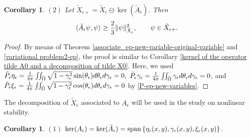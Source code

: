 \documentclass[1 [leqno, 11pt]{amsart}
\numberwithin{equation}{section}
\let\ep=\epsilon
\newtheorem{Corollary}[Theorem]{Corollary}
\begin{document}
\begin{CJK*}{GBK}{song}
\begin{Corollary}
$(2)$ Let $\tilde X_{\ep+}=\tilde X_\ep \ominus\ker (\tilde A_\ep)$. Then
\begin{align*}
\langle \tilde A_\ep \psi,\psi\rangle \geq {2\over3} \| \psi\|_{\tilde X_\ep}^2, \quad \quad \psi\in \tilde X_{\ep+}.
\end{align*}
\end{Corollary}

\begin{proof}
By means of  Theorem \ref{associate_ep-new-variable-original-variable} and \eqref{variational problem2-ep}, the proof is similar to Corollary \ref{kernel of  the operator tilde A0 and a decomposition of tilde X0}. Here, we used $\tilde P_\ep\eta_\ep={1\over 4\pi}\iint_{\tilde \Omega}\sqrt{1-\gamma_\ep^2}\sin(\theta_\ep)d\theta_\ep d\gamma_\ep=0,$ $\tilde P_\ep\gamma_\ep={1\over 4\pi}\iint_{\tilde \Omega}\gamma_\ep d\theta_\ep d\gamma_\ep=0$, and $\tilde P_\ep\xi_\ep={1\over 4\pi}\iint_{\tilde \Omega}\sqrt{1-\gamma_\ep^2}\cos(\theta_\ep)d\theta_\ep d\gamma_\ep=0$ by \eqref{P-ep-new-variables}.
\end{proof}
The decomposition of $\tilde X_{\ep}$ associated to $A_\ep$ will be used  in the study on nonlinear stability.
\begin{Corollary}\label{kernel of  the operator A-ep and a decomposition of tilde Xep}
$(1)$ $\ker ( A_\ep)=\ker (\tilde A_\ep)={\rm{span}}\left\{\eta_\ep(x,y), \gamma_\ep(x,y), \xi_\ep(x,y)\right\}$.


\end{Corollary}
\end{CJK*}
\end{document}
